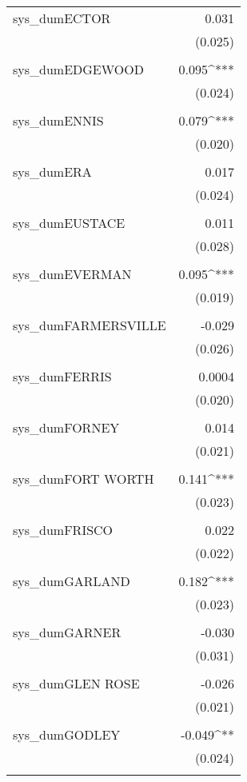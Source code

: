 \begin{table}[!htbp]
\begin{tabular}{@{\extracolsep{5pt}}lD{.}{.}{-3} }
 sys\_dumECTOR & 0.031 \\ 
  & (0.025) \\ 
  & \\ 
 sys\_dumEDGEWOOD & 0.095^{***} \\ 
  & (0.024) \\ 
  & \\ 
 sys\_dumENNIS & 0.079^{***} \\ 
  & (0.020) \\ 
  & \\ 
 sys\_dumERA & 0.017 \\ 
  & (0.024) \\ 
  & \\ 
 sys\_dumEUSTACE & 0.011 \\ 
  & (0.028) \\ 
  & \\ 
 sys\_dumEVERMAN & 0.095^{***} \\ 
  & (0.019) \\ 
  & \\ 
 sys\_dumFARMERSVILLE & -0.029 \\ 
  & (0.026) \\ 
  & \\ 
 sys\_dumFERRIS & 0.0004 \\ 
  & (0.020) \\ 
  & \\ 
 sys\_dumFORNEY & 0.014 \\ 
  & (0.021) \\ 
  & \\ 
 sys\_dumFORT WORTH & 0.141^{***} \\ 
  & (0.023) \\ 
  & \\ 
 sys\_dumFRISCO & 0.022 \\ 
  & (0.022) \\ 
  & \\ 
 sys\_dumGARLAND & 0.182^{***} \\ 
  & (0.023) \\ 
  & \\ 
 sys\_dumGARNER & -0.030 \\ 
  & (0.031) \\ 
  & \\ 
 sys\_dumGLEN ROSE & -0.026 \\ 
  & (0.021) \\ 
  & \\ 
 sys\_dumGODLEY & -0.049^{**} \\ 
  & (0.024) \\ 
  & \\ 

\end{tabular}
\end{table}
